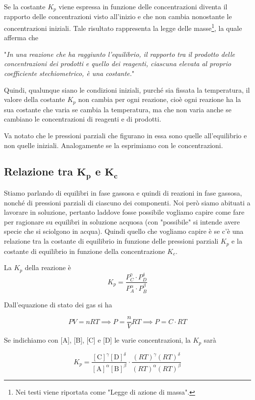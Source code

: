 Se la costante $K_p$ viene espressa in funzione delle concentrazioni diventa il rapporto delle concentrazioni visto all'inizio e che non cambia nonostante le concentrazioni iniziali. Tale risultato rappresenta la legge delle masse\footnote{Nei testi viene riportata come "Legge di azione di massa".}, la quale afferma che

\vspace{0.2cm}"\textit{In una reazione che ha raggiunto l'equilibrio, il rapporto tra il prodotto delle concentrazioni dei prodotti e quello dei reagenti, ciascuna elevata al proprio coefficiente stechiometrico, è una costante.}"

\vspace{0.2cm}Quindi, qualunque siano le condizioni iniziali, purché sia fissata la temperatura, il valore della costante $K_p$ non cambia per ogni reazione, cioè ogni reazione ha la sua costante che varia se cambia la temperatura, ma che non varia anche se cambiano le concentrazioni di reagenti e di prodotti.

Va notato che le pressioni parziali che figurano in essa sono quelle all'equilibrio e non quelle iniziali. Analogamente se la esprimiamo con le concentrazioni.
\subsection[Relazione tra \texorpdfstring{$K_p$}{K\_p} e \texorpdfstring{$K_c$}{K\_c}]%
{Relazione tra $\boldsymbol{K_p}$ e $\boldsymbol{K_c}$}
Stiamo parlando di equilibri in fase gassosa e quindi di reazioni in fase gassosa, nonché di pressioni parziali di ciascuno dei componenti. Noi però siamo abituati a lavorare in soluzione, pertanto laddove fosse possibile vogliamo capire come fare per ragionare su equilibri in soluzione acquosa (con "possibile" si intende avere specie che si sciolgono in acqua). Quindi quello che vogliamo capire è se c'è una relazione tra la costante di equilibrio in funzione delle pressioni parziali $K_p$ e la costante di equilibrio in funzione della concentrazione $K_c$.

La $K_p$ della reazione è
$$K_p = \frac{P_C^{\gamma} \cdot P_D^{\delta}}{P_A^{\alpha} \cdot P_B^{\beta}}$$

Dall'equazione di stato dei gas si ha

$$PV=nRT \implies P=\frac{n}{V}RT \implies P=C \cdot RT$$

Se indichiamo con [A], [B], [C] e [D] le varie concentrazioni, la $K_p$ sarà

$$K_p = \frac{[\text{C}]^{\gamma} [\text{D}]^{\delta}}{[\text{A}]^{\alpha} [\text{B}]^{\beta}} \cdot \frac{(RT)^{\gamma} (RT)^{\delta}}{(RT)^{\alpha} (RT)^{\beta}}$$

